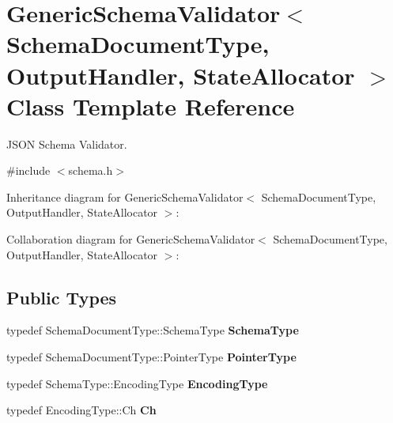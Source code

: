 \hypertarget{class_generic_schema_validator}{}\section{Generic\+Schema\+Validator$<$ Schema\+Document\+Type, Output\+Handler, State\+Allocator $>$ Class Template Reference}
\label{class_generic_schema_validator}


J\+S\+ON Schema Validator.  




{\ttfamily \#include $<$schema.\+h$>$}



Inheritance diagram for Generic\+Schema\+Validator$<$ Schema\+Document\+Type, Output\+Handler, State\+Allocator $>$\+:


Collaboration diagram for Generic\+Schema\+Validator$<$ Schema\+Document\+Type, Output\+Handler, State\+Allocator $>$\+:
\subsection*{Public Types}
\begin{DoxyCompactItemize}
\item 
\mbox{\label{class_generic_schema_validator_ac79628f00f6720bbabb70b44f0d076a0}} 
typedef Schema\+Document\+Type\+::\+Schema\+Type {\bfseries Schema\+Type}
\item 
\mbox{\label{class_generic_schema_validator_ae0c6c9a9c0ff6bae80e75c6705f2668b}} 
typedef Schema\+Document\+Type\+::\+Pointer\+Type {\bfseries Pointer\+Type}
\item 
\mbox{\label{class_generic_schema_validator_acf1c5361bb96da87d23167d8720b1ea5}} 
typedef Schema\+Type\+::\+Encoding\+Type {\bfseries Encoding\+Type}
\item 
\mbox{\label{class_generic_schema_validator_a8b7dab5a0cda9cc0adaefb4401d260c1}} 
typedef Encoding\+Type\+::\+Ch {\bfseries Ch}
\end{DoxyCompactItemize}
